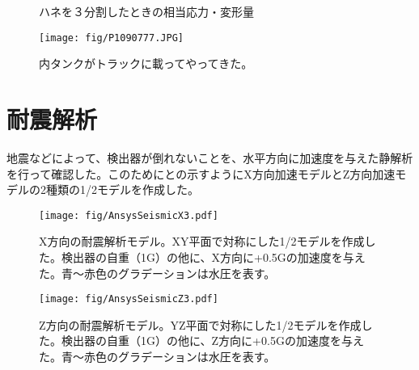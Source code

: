 \begin{figure}[htbp]
  \begin{minipage}{0.47\textwidth}
  \end{minipage}
  \hfill
  \begin{minipage}{0.47\textwidth}
  \end{minipage}
    \caption{ハネを３分割したときの相当応力・変形量}
  \label{AnsysFVOverlap3}
\end{figure}


\begin{figure}[htbp]
\begin{center}
\texttt{[image: fig/P1090777.JPG]}
\caption[内タンク]{内タンクがトラックに載ってやってきた。}
\label{InstallInnerTank}
\end{center}
\end{figure}
\fi

\section{耐震解析}
地震などによって、検出器が倒れないことを、水平方向に加速度を与えた静解析を行って確認した。このためにとの示すようにX方向加速モデルとZ方向加速モデルの2種類の1/2モデルを作成した。


\begin{figure}[!h]
\begin{minipage}{0.47\textwidth}
\centering
\texttt{[image: fig/AnsysSeismicX3.pdf]}
\caption[耐震解析モデル：X方向]{X方向の耐震解析モデル。XY平面で対称にした1/2モデルを作成した。検出器の自重（1G）の他に、X方向に+0.5Gの加速度を与えた。青〜赤色のグラデーションは水圧を表す。}
\label{XModel}
\end{minipage}
\hfill
\begin{minipage}{0.47\textwidth}
\centering
\texttt{[image: fig/AnsysSeismicZ3.pdf]}
\caption[耐震解析モデル：Z方向]{Z方向の耐震解析モデル。YZ平面で対称にした1/2モデルを作成した。検出器の自重（1G）の他に、Z方向に+0.5Gの加速度を与えた。青〜赤色のグラデーションは水圧を表す。}
\label{ZModel}
\end{minipage}
\end{figure}




